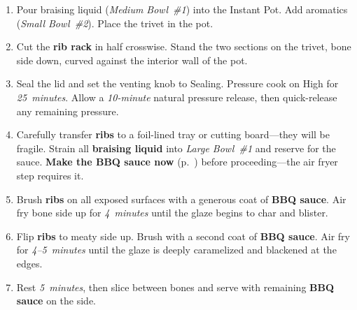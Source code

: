 \documentclass[11pt,letterpaper]{article}
\begin{document}
\begin{enumerate}
    \item Pour braising liquid (\textit{Medium Bowl~\#1}) into the Instant Pot. Add aromatics (\textit{Small Bowl~\#2}). Place the trivet in the pot.

    \item Cut the \textbf{rib rack} in half crosswise. Stand the two sections on the trivet, bone side down, curved against the interior wall of the pot.

    \item Seal the lid and set the venting knob to Sealing. Pressure cook on High for \textit{25~minutes}. Allow a \textit{10-minute} natural pressure release, then quick-release any remaining pressure.

    \item Carefully transfer \textbf{ribs} to a foil-lined tray or cutting board---they will be fragile. Strain all \textbf{braising liquid} into \textit{Large Bowl~\#1} and reserve for the sauce. \textbf{Make the BBQ sauce now} (p.~\pageref{sec:sauce}) before proceeding---the air fryer step requires it.

    \item Brush \textbf{ribs} on all exposed surfaces with a generous coat of \textbf{BBQ sauce}. Air fry bone side up for \textit{4~minutes} until the glaze begins to char and blister.

    \item Flip \textbf{ribs} to meaty side up. Brush with a second coat of \textbf{BBQ sauce}. Air fry for \textit{4--5~minutes} until the glaze is deeply caramelized and blackened at the edges.

    \item Rest \textit{5~minutes}, then slice between bones and serve with remaining \textbf{BBQ sauce} on the side.
\end{enumerate}

\newpage
\end{document}
